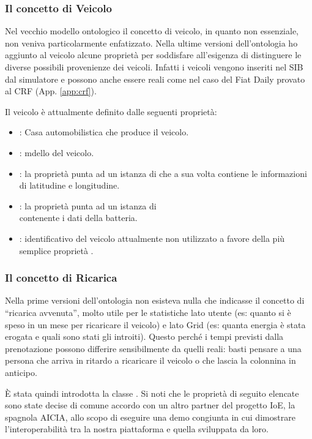 \subsubsection{Il concetto di Veicolo}\label{subsubsec:vehicle}

Nel vecchio modello ontologico il concetto di veicolo, in quanto non essenziale, non veniva particolarmente enfatizzato. Nella ultime versioni dell'ontologia ho aggiunto al veicolo alcune proprietà per soddisfare all'esigenza di distinguere le diverse possibili provenienze dei veicoli. Infatti i veicoli vengono inseriti nel SIB dal simulatore e possono anche essere reali come nel caso del Fiat Daily provato al CRF (App. \ref{app:crf}).

Il veicolo è attualmente definito dalle seguenti proprietà:

\begin{itemize}
	\item {}: Casa automobilistica che produce il veicolo.
	\item {}: mdello del veicolo.
	\item {}: la proprietà punta ad un istanza di  che a sua volta contiene le informazioni di latitudine e longitudine.
	\item {}: la proprietà punta ad un istanza di \\  contenente i dati della batteria.
	\item {}: identificativo del veicolo attualmente non utilizzato a favore della più semplice proprietà .
\end{itemize}

\subsubsection{Il concetto di Ricarica}

Nella prime versioni dell'ontologia non esisteva nulla che indicasse il concetto di ``ricarica avvenuta'', molto utile per le statistiche lato utente (es: quanto si è speso in un mese per ricaricare il veicolo) e lato Grid (es: quanta energia è stata erogata e quali sono stati gli introiti). Questo perché i tempi previsti dalla prenotazione possono differire sensibilmente da quelli reali: basti pensare a una persona che arriva in ritardo a ricaricare il veicolo o che lascia la colonnina in anticipo. 

È stata quindi introdotta la classe . Si noti che le proprietà di seguito elencate sono state decise di comune accordo con un altro partner del progetto IoE, la spagnola AICIA, allo scopo di eseguire una demo congiunta in cui dimostrare l'interoperabilità tra la nostra piattaforma e quella sviluppata da loro.

